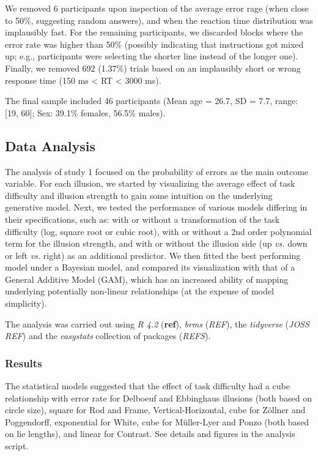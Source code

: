 \documentclass[
  man,floatsintext]{apa6}
\begin{document}
We removed 6 participants upon inspection of the average error rage (when close to 50\%, suggesting random answers), and when the reaction time distribution was implausibly fast. For the remaining participants, we discarded blocks where the error rate was higher than 50\% (possibly indicating that instructions got mixed up; e.g., participants were selecting the shorter line instead of the longer one). Finally, we removed 692 (1.37\%) trials based on an implausibly short or wrong response time (150 ms \textless{} RT \textless{} 3000 ms).

The final sample included 46 participants (Mean age = 26.7, SD = 7.7, range: {[}19, 60{]}; Sex: 39.1\% females, 56.5\% males).

\hypertarget{data-analysis}{%
\subsection{Data Analysis}\label{data-analysis}}

The analysis of study 1 focused on the probability of errors as the main outcome variable. For each illusion, we started by visualizing the average effect of task difficulty and illusion strength to gain some intuition on the underlying generative model. Next, we tested the performance of various models differing in their specifications, such as: with or without a transformation of the task difficulty (log, square root or cubic root), with or without a 2nd order polynomial term for the illusion strength, and with or without the illusion side (up \emph{vs.} down or left \emph{vs.} right) as an additional predictor. We then fitted the best performing model under a Bayesian model, and compared its visualization with that of a General Additive Model (GAM), which has an increased ability of mapping underlying potentially non-linear relationships (at the expense of model simplicity).

The analysis was carried out using \emph{R 4.2} (\textbf{ref}), \emph{brms} (\emph{REF}), the \emph{tidyverse} (\emph{JOSS REF}) and the \emph{easystats} collection of packages (\emph{REFS}).

\hypertarget{results}{%
\subsubsection{Results}\label{results}}

The statistical models suggested that the effect of task difficulty had a cube relationship with error rate for Delboeuf and Ebbinghaus illusions (both based on circle size), square for Rod and Frame, Vertical-Horizontal, cube for Zöllner and Poggendorff, exponential for White, cube for Müller-Lyer and Ponzo (both based on lie lengths), and linear for Contrast. See details and figures in the analysis script.
\end{document}
